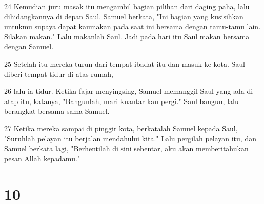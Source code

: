 \par 24 Kemudian juru masak itu mengambil bagian pilihan dari daging paha, lalu dihidangkannya di depan Saul. Samuel berkata, "Ini bagian yang kusisihkan untukmu supaya dapat kaumakan pada saat ini bersama dengan tamu-tamu lain. Silakan makan." Lalu makanlah Saul. Jadi pada hari itu Saul makan bersama dengan Samuel.
\par 25 Setelah itu mereka turun dari tempat ibadat itu dan masuk ke kota. Saul diberi tempat tidur di atas rumah,
\par 26 lalu ia tidur. Ketika fajar menyingsing, Samuel memanggil Saul yang ada di atap itu, katanya, "Bangunlah, mari kuantar kau pergi." Saul bangun, lalu berangkat bersama-sama Samuel.
\par 27 Ketika mereka sampai di pinggir kota, berkatalah Samuel kepada Saul, "Suruhlah pelayan itu berjalan mendahului kita." Lalu pergilah pelayan itu, dan Samuel berkata lagi, "Berhentilah di sini sebentar, aku akan memberitahukan pesan Allah kepadamu."

\chapter{10}

